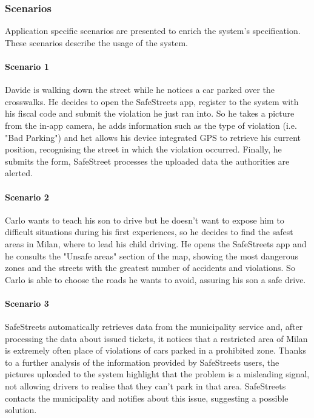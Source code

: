 \subsubsection{Scenarios}

Application specific scenarios are presented to enrich the system's specification. These scenarios describe the usage of the system.

\paragraph{Scenario 1}
\label{scenario:1}
	Davide is walking down the street while he notices a car parked over the crosswalks. He decides to open the SafeStreets app, register to the system with his fiscal code and submit the violation he just ran into. So he takes a picture from the in-app camera, he adds information such as the type of violation (i.e. "Bad Parking") and het allows his device integrated GPS to retrieve his current position, recognising the street in which the violation occurred. Finally, he submits the form, SafeStreet processes the uploaded data the authorities are alerted.

\paragraph{Scenario 2}
\label{scenario:2}
	Carlo wants to teach his son to drive but he doesn't want to expose him to difficult situations during his first experiences, so he decides to find the safest areas in Milan, where to lead his child driving. He opens the SafeStreets app and he consults the "Unsafe areas" section of the map, showing the most dangerous zones and the streets with the greatest number of accidents and violations. So Carlo is able to choose the roads he wants to avoid, assuring his son a safe drive.

\paragraph{Scenario 3}
\label{scenario:3}
	SafeStreets automatically retrieves data from the municipality service and, after processing the data about issued tickets, it notices that a restricted area of Milan is extremely often place of violations of cars parked in a prohibited zone. Thanks to a further analysis of the information provided by SafeStreets users, the pictures uploaded to the system highlight that the problem is a misleading signal, not allowing drivers to realise that they can't park in that area. SafeStreets contacts the municipality and notifies about this issue, suggesting a possible solution.

